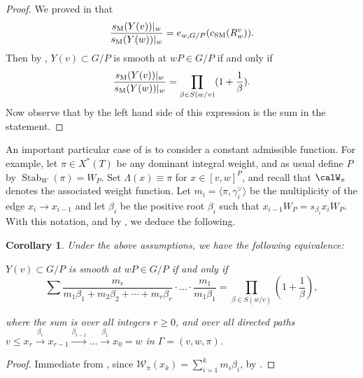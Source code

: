 \documentclass[11pt]{article}
\newtheorem{corol}[theo]{Corollary}
\theoremstyle{definition}
\numberwithin{equation}{section}
\newcommand{\csm}{c_{\mathrm{SM}}}
\newcommand{\ssm}{s_{\mathrm{M}}}
\DeclareMathOperator{\Stab}{Stab}
\begin{document}
\begin{proof} We proved in  that 
	\[ \frac{\ssm(Y(v))|_w}{\ssm(Y(w))|_w}=e_{w,G/P} (\csm(R_w^{v})) \/. \]
	Then by 
	, $Y(v)\subset G/P$ is smooth at $wP\in G/P$ if and only if 
	\[ \frac{\ssm(Y(v))|_w}{\ssm(Y(w))|_w} = \prod_{\beta\in S(w/v)}(1+\frac{1}{\beta}) \/. \]
	Now observe that by  the left hand side of this expression is the sum in the statement.\end{proof}
An important particular case of  is to consider a constant admissible function.
For example, let $\pi\in X^*(T)$ be any dominant integral weight, and as usual define 
$P$ by $\Stab_W(\pi)=W_P$. Set
$\Lambda(x) \equiv \pi$ for $x \in [v,w]^P$, and recall that $\calW_\pi$ denotes the associated
weight function. Let $m_i = \langle \pi, \gamma_i^\vee \rangle$ be the multiplicity of the 
edge $x_i \to x_{i-1}$ and let $\beta_i$ be the positive root
$\beta_i$ such that $x_{i-1}W_P = s_{\beta_i}x_i W_P$.
With this notation, and by , we deduce the following.
\begin{corol}\label{col:NakP}
	Under the above assumptions,
	we have the following equivalence:
	\begin{center}
		$Y(v)\subset G/P$ is smooth at $wP\in G/P$  if and only if
		\[
		\sum \frac{m_r}{m_1\beta_1+m_2\beta_2+\cdots +m_r\beta_r} \cdot \ldots \cdot 
		\frac{m_1}{m_1\beta_1}
		=\prod_{\beta \in S(w/v)}\left(1+\frac{1}{\beta}\right),
		\]
	\end{center}
	where the sum is over all integers $r \ge 0$, and over all directed paths 
	$v\leq x_r \overset{\beta_r}{\to} x_{r-1} \overset{\beta_{r-1}}{\to} \ldots \overset{\beta_1}{\to} x_0 = w$ in $\Gamma= (v,w,\pi)$. 
\end{corol}
\begin{proof} Immediate from , since $\mathcal{W}_\pi(x_k)=\sum_{i=1}^k m_i \beta_i$,
	by . 
\end{proof}
\end{document}

